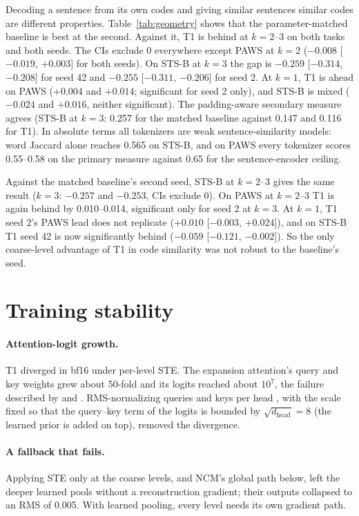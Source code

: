 \documentclass[11pt]{article}
\begin{document}
Decoding a sentence from its own codes and giving similar sentences similar codes are different properties. Table~\ref{tab:geometry} shows that the parameter-matched baseline is best at the second. Against it, T1 is behind at $k{=}2$--3 on both tasks and both seeds. The CIs exclude 0 everywhere except PAWS at $k{=}2$ ($-0.008$ [$-0.019$, $+0.003$] for both seeds). On STS-B at $k{=}3$ the gap is $-0.259$ [$-0.314$, $-0.208$] for seed 42 and $-0.255$ [$-0.311$, $-0.206$] for seed 2. At $k{=}1$, T1 is ahead on PAWS ($+0.004$ and $+0.014$; significant for seed 2 only), and STS-B is mixed ($-0.024$ and $+0.016$, neither significant). The padding-aware secondary measure agrees (STS-B at $k{=}3$: 0.257 for the matched baseline against 0.147 and 0.116 for T1). In absolute terms all tokenizers are weak sentence-similarity models: word Jaccard alone reaches 0.565 on STS-B, and on PAWS every tokenizer scores 0.55--0.58 on the primary measure against 0.65 for the sentence-encoder ceiling.

Against the matched baseline's second seed, STS-B at $k{=}2$--3 gives the same result ($k{=}3$: $-0.257$ and $-0.253$, CIs exclude 0). On PAWS at $k{=}2$--3 T1 is again behind by 0.010--0.014, significant only for seed 2 at $k{=}3$. At $k{=}1$, T1 seed 2's PAWS lead does not replicate ($+0.010$ [$-0.003$, $+0.024$]), and on STS-B T1 seed 42 is now significantly behind ($-0.059$ [$-0.121$, $-0.002$]). So the only coarse-level advantage of T1 in code similarity was not robust to the baseline's seed.

\section{Training stability}\label{sec:stability}
\paragraph{Attention-logit growth.} T1 diverged in bf16 under per-level STE. The expansion attention's query and key weights grew about 50-fold and its logits reached about $10^7$, the failure described by \citet{dehghani2023vit22b} and \citet{wortsman2024proxies}. RMS-normalizing queries and keys per head \citep{henry2020qknorm}, with the scale fixed so that the query--key term of the logits is bounded by $\sqrt{d_\text{head}}=8$ (the learned prior is added on top), removed the divergence.

\paragraph{A fallback that fails.} Applying STE only at the coarse levels, and NCM's global path below, left the deeper learned pools without a reconstruction gradient; their outputs collapsed to an RMS of 0.005. With learned pooling, every level needs its own gradient path.
\end{document}
